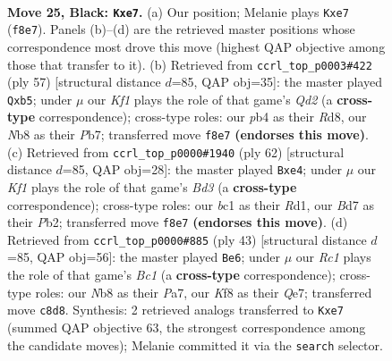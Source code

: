 \documentclass[11pt]{article}
\begin{document}
\begin{figure}[p]\centering
\begin{subfigure}{0.46\textwidth}\centering
\resizebox{\linewidth}{!}{%
\newchessgame
\chessboard[
  setfen={rnr2k2/pppbN3/q4p2/P2p4/1P1P4/4P1P1/3Q4/RNB2RK1 b - - 0 25},
  showmover=false,
  pgfstyle=straightmove, color=movearrow, markmove={f8-e7}
]}
\caption{}
\end{subfigure}\hfill
\begin{subfigure}{0.46\textwidth}\centering
\resizebox{\linewidth}{!}{%
\newchessgame
\chessboard[
  setfen={r2r2k1/1p1q1pb1/5n1p/1N2P1p1/1B6/pQ2PP1P/P5P1/R1R3K1 b - - 0 29},
  showmover=false,
  pgfstyle=straightmove, color=movearrow, markmove={d7-b5}
]}
\caption{}
\end{subfigure}
\\[4pt]
\begin{subfigure}{0.46\textwidth}\centering
\resizebox{\linewidth}{!}{%
\newchessgame
\chessboard[
  setfen={4qrnk/r6p/p3p1p1/3p4/P2Pn1P1/1N1B3Q/1P3P2/1K1R3R w - - 1 32},
  showmover=false,
  pgfstyle=straightmove, color=movearrow, markmove={d3-e4}
]}
\caption{}
\end{subfigure}\hfill
\begin{subfigure}{0.46\textwidth}\centering
\resizebox{\linewidth}{!}{%
\newchessgame
\chessboard[
  setfen={r1b2k2/pp2q2r/2pN1pR1/2n5/1bP2Q2/8/PP3P1P/2KR1B2 b - - 0 22},
  showmover=false,
  pgfstyle=straightmove, color=movearrow, markmove={c8-e6}
]}
\caption{}
\end{subfigure}
\caption{\textbf{Move 25, Black: \texttt{Kxe7}.} (a) Our position; Melanie plays \texttt{Kxe7} (\texttt{f8e7}). Panels (b)--(d) are the retrieved master positions whose correspondence most drove this move (highest QAP objective among those that transfer to it). (b) Retrieved from \texttt{ccrl\_top\_p0003\#422} (ply 57) [structural distance $d$=85, QAP obj=35]: the master played \texttt{Qxb5}; under $\mu$ our \emph{Kf1} plays the role of that game's \emph{Qd2} (a \textbf{cross-type} correspondence); cross-type roles: our \emph{p}b4 as their \emph{R}d8, our \emph{N}b8 as their \emph{P}b7; transferred move \texttt{f8e7} \textbf{(endorses this move)}. (c) Retrieved from \texttt{ccrl\_top\_p0000\#1940} (ply 62) [structural distance $d$=85, QAP obj=28]: the master played \texttt{Bxe4}; under $\mu$ our \emph{Kf1} plays the role of that game's \emph{Bd3} (a \textbf{cross-type} correspondence); cross-type roles: our \emph{b}c1 as their \emph{R}d1, our \emph{B}d7 as their \emph{P}b2; transferred move \texttt{f8e7} \textbf{(endorses this move)}. (d) Retrieved from \texttt{ccrl\_top\_p0000\#885} (ply 43) [structural distance $d$=85, QAP obj=56]: the master played \texttt{Be6}; under $\mu$ our \emph{Rc1} plays the role of that game's \emph{Bc1} (a \textbf{cross-type} correspondence); cross-type roles: our \emph{N}b8 as their \emph{P}a7, our \emph{K}f8 as their \emph{Q}e7; transferred move \texttt{c8d8}. Synthesis: 2 retrieved analogs transferred to \texttt{Kxe7} (summed QAP objective 63, the strongest correspondence among the candidate moves); Melanie committed it via the \texttt{search} selector.}
\label{fig:thought-m49}
\end{figure}
\end{document}
